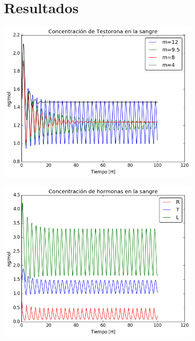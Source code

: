 \documentclass[10pt]{beamer}
\begin{document}
\section{Resultados}
\begin{frame}
\begin{center}
 \includegraphics[width=4in]{imagenes/Graficas/testosterona1.png}
\end{center}
\end{frame}

\begin{frame}
\begin{center}
 \includegraphics[width=4in]{imagenes/Graficas/hormonas1.png}
\end{center}
\end{frame}
\end{document}
